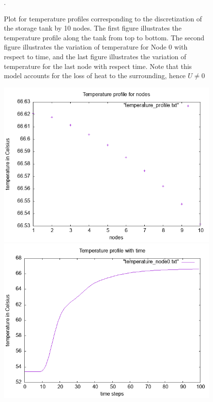 \documentclass{article}
\begin{document}
\begin{figure}[ht]
\caption{Plot for temperature profiles corresponding to the discretization of the storage tank by 10 nodes. The first figure illustrates the temperature profile along the tank from top to bottom. The second figure illustrates the variation of temperature for Node 0 with respect to time, and the last figure illustrates the variation of temperature for the last node with respect time. Note that this model accounts for the loss of heat to the surrounding, hence $U \neq 0$}.
\end{figure}

\begin{figure}[ht]
\centering
\includegraphics[scale = 0.5]{temperature_profile_u_0.png}
\includegraphics[scale =0.5]{temperature_node0_u_0.png}

\end{figure}
\end{document}

